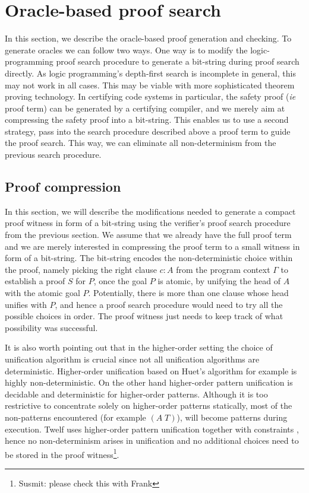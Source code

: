 \documentclass{acmconf}
\begin{document}
\section{Oracle-based proof search}
\label{sec:oracles}

In this section, we describe the oracle-based proof generation and
checking. To generate oracles we can follow two ways. One way is to
modify the logic-programming proof search procedure to generate a
bit-string during proof search directly. As logic programming's
depth-first search is incomplete in general, this may not work in all
cases.  This may be viable with more sophisticated theorem proving
technology. In certifying code systems in particular, the safety proof
({\em ie} proof term) can be generated by a certifying compiler, and
we merely aim at compressing the safety proof into a bit-string. This
enables us to use a second strategy, pass into the search procedure
described above a proof term to guide the proof search. This way, we
can eliminate all non-determinism from the previous search procedure.

\subsection{Proof compression}

In this section, we will describe the modifications needed to generate
a compact proof witness in form of a bit-string using the verifier's
proof search procedure from the previous section. We assume that we
already have the full proof term and we are merely interested in
compressing the proof term to a small witness in form of a bit-string.
The bit-string encodes the non-deterministic choice within the proof, namely picking
the right clause $c:A$ from the program context $\Gamma$ to establish a
proof $S$ for $P$, once the goal $P$ is atomic, by unifying the head
of $A$ with the atomic goal $P$. Potentially, there is more than one
clause whose head unifies with $P$, and hence a proof search procedure
would need to try all the possible choices in order. The proof witness
just needs to keep track of what possibility was successful.

It is also worth pointing out that in the higher-order setting the
choice of unification algorithm is crucial since not all unification
algorithms are deterministic. Higher-order unification based on Huet's
algorithm \cite{Huet75} for example is highly non-deterministic. On the
other hand higher-order pattern unification \cite{Miller91jlc} is
decidable and deterministic for higher-order patterns. Although it is too restrictive to
concentrate solely on higher-order patterns statically, most of the
non-patterns encountered (for example $(A\;T)$), will become patterns
during execution. Twelf uses higher-order pattern unification together
with constraints \cite{Pfenning91lf}, hence no non-determinism arises
in unification and no additional choices need to be stored in the proof
witness\footnote{Susmit: please check this with Frank}. 
\end{document}
